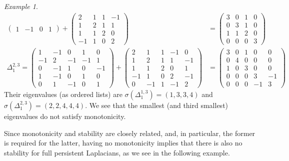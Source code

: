 \documentclass[11pt]{article}
\theoremstyle{definition}
\theoremstyle{remark}
\newtheorem{example}[theorem]{Example}
\begin{document}
\begin{example}
\begin{align*}
\begin{pmatrix}
            1&-1&0&1
        \end{pmatrix} + \begin{pmatrix}
            2&1&1&-1\\
            1&2&1&1\\
            1&1&2&0\\
            -1&1&0&2
        \end{pmatrix} &=\begin{pmatrix}
            3&0&1&0\\
            0&3&1&0\\
            1&1&2&0\\
            0&0&0&3
        \end{pmatrix}\\
        \Delta_1^{2,3}=\begin{pmatrix}
            1&-1&0&1&0\\
            -1&2&-1&-1&1\\
            0&-1&1&0&-1\\
            1&-1&0&1&0\\
            0&1&-1&0&1
        \end{pmatrix} + \begin{pmatrix}
            2&1&1&-1&0\\
            1&2&1&1&-1\\
            1&1&2&0&1\\
            -1&1&0&2&-1\\
            0&-1&1&-1&2
        \end{pmatrix}&=
        \begin{pmatrix}
            3&0&1&0&0\\
            0&4&0&0&0\\
            1&0&3&0&0\\
            0&0&0&3&-1\\
            0&0&0&-1&3
        \end{pmatrix}
    \end{align*}
    Their eigenvalues (as ordered lists) are $\sigma(\Delta_1^{1,3})=(1,3,3,4)$ and $\sigma(\Delta_1^{2,3})=(2,2,4,4,4)$.  We see that the smallest (and third smallest) eigenvalues do not satisfy monotonicity.
\end{example}


Since monotonicity and stability are closely related, and, in particular, the former is required for the latter, having no monotonicity implies that there is also no stability for full persistent Laplacians, as we see in the following example.
\end{document}
